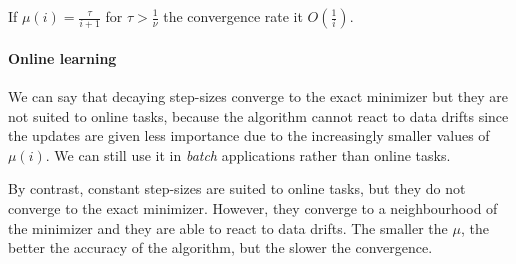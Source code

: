If $\mu(i) = \frac{\tau}{i+1}$ for $\tau > \frac{1}{\nu}$ the convergence rate it $O(\frac{1}{i})$.

\paragraph*{Online learning}
We can say that decaying step-sizes converge to the exact minimizer but they are not suited to online tasks, because the algorithm cannot react to data drifts since the updates are given less importance due to the increasingly smaller values of $\mu(i)$. We can still use it in \textit{batch} applications rather than online tasks.

By contrast, constant step-sizes are suited to online tasks, but they do not converge to the exact minimizer. However, they converge to a neighbourhood of the minimizer and they are able to react to data drifts. The smaller the $\mu$, the better the accuracy of the algorithm, but the slower the convergence.